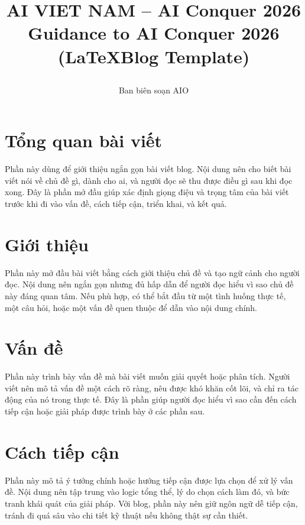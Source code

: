 \documentclass[12pt]{ai_conquer2026}
\title{%
  \begin{center}
        \Large {AI VIET NAM -- AI Conquer 2026}\\[.5ex]  
        \Huge \textbf{Guidance to AI Conquer 2026 \\ 
        (\LaTeX\space Blog Template)}\\[.5ex]
  \end{center}
}
\author{
        \begin{minipage}{\textwidth}
        \centering
        {
        \vspace{-1.5em}
          Ban biên soạn AIO
        }\\
      \end{minipage}
    }
\date{}
\begin{document}
\maketitle
\vspace{-5.5em}
\setlength{\epigraphwidth}{0.6\textwidth}

\section{Tổng quan bài viết}

Phần này dùng để giới thiệu ngắn gọn bài viết blog. Nội dung nên cho biết bài viết nói về chủ đề gì, dành cho ai, và người đọc sẽ thu được điều gì sau khi đọc xong. Đây là phần mở đầu giúp xác định giọng điệu và trọng tâm của bài viết trước khi đi vào vấn đề, cách tiếp cận, triển khai, và kết quả.

\newpage
\setcounter{tocdepth}{2}
\tableofcontents
\thispagestyle{fancy}

\newpage
\section{Giới thiệu}

Phần này mở đầu bài viết bằng cách giới thiệu chủ đề và tạo ngữ cảnh cho người đọc. Nội dung nên ngắn gọn nhưng đủ hấp dẫn để người đọc hiểu vì sao chủ đề này đáng quan tâm. Nếu phù hợp, có thể bắt đầu từ một tình huống thực tế, một câu hỏi, hoặc một vấn đề quen thuộc để dẫn vào nội dung chính.

\section{Vấn đề}

Phần này trình bày vấn đề mà bài viết muốn giải quyết hoặc phân tích. Người viết nên mô tả vấn đề một cách rõ ràng, nêu được khó khăn cốt lõi, và chỉ ra tác động của nó trong thực tế. Đây là phần giúp người đọc hiểu vì sao cần đến cách tiếp cận hoặc giải pháp được trình bày ở các phần sau.

\section{Cách tiếp cận}

Phần này mô tả ý tưởng chính hoặc hướng tiếp cận được lựa chọn để xử lý vấn đề. Nội dung nên tập trung vào logic tổng thể, lý do chọn cách làm đó, và bức tranh khái quát của giải pháp. Với blog, phần này nên giữ ngôn ngữ dễ tiếp cận, tránh đi quá sâu vào chi tiết kỹ thuật nếu không thật sự cần thiết.
\end{document}
